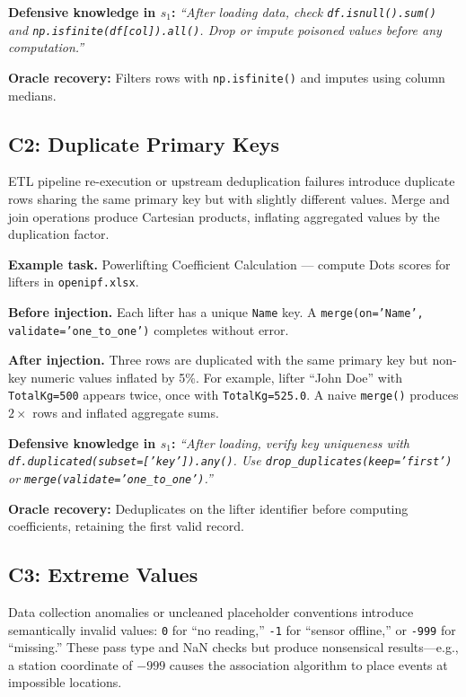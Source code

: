 \documentclass[11pt]{article}
\begin{document}
\textbf{Defensive knowledge in $s_1$:} \textit{``After loading data, check \texttt{df.isnull().sum()} and \texttt{np.isfinite(df[col]).all()}. Drop or impute poisoned values before any computation.''}

\textbf{Oracle recovery:} Filters rows with \texttt{np.isfinite()} and imputes using column medians.

\subsection{C2: Duplicate Primary Keys}

\begin{anomalyblock}
ETL pipeline re-execution or upstream deduplication failures introduce duplicate rows sharing the same primary key but with slightly different values. Merge and join operations produce Cartesian products, inflating aggregated values by the duplication factor.
\end{anomalyblock}

\textbf{Example task.} Powerlifting Coefficient Calculation --- compute Dots scores for lifters in \texttt{openipf.xlsx}.

\textbf{Before injection.} Each lifter has a unique \texttt{Name} key. A \texttt{merge(on='Name', validate='one\_to\_one')} completes without error.

\textbf{After injection.} Three rows are duplicated with the same primary key but non-key numeric values inflated by 5\%. For example, lifter ``John Doe'' with \texttt{TotalKg=500} appears twice, once with \texttt{TotalKg=525.0}. A naive \texttt{merge()} produces $2\times$ rows and inflated aggregate sums.

\textbf{Defensive knowledge in $s_1$:} \textit{``After loading, verify key uniqueness with \texttt{df.duplicated(subset=['key']).any()}. Use \texttt{drop\_duplicates(keep='first')} or \texttt{merge(validate='one\_to\_one')}.''}

\textbf{Oracle recovery:} Deduplicates on the lifter identifier before computing coefficients, retaining the first valid record.

\subsection{C3: Extreme Values}

\begin{anomalyblock}
Data collection anomalies or uncleaned placeholder conventions introduce semantically invalid values: \texttt{0} for ``no reading,'' \texttt{-1} for ``sensor offline,'' or \texttt{-999} for ``missing.'' These pass type and NaN checks but produce nonsensical results---e.g., a station coordinate of $-999$ causes the association algorithm to place events at impossible locations.
\end{anomalyblock}
\end{document}
